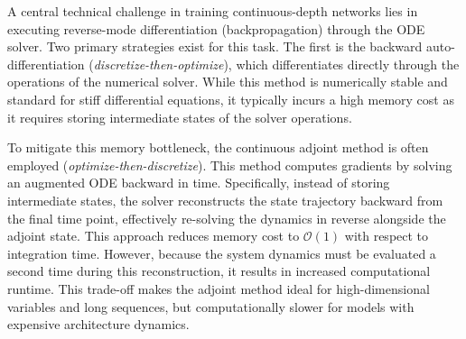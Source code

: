 A central technical challenge in training continuous-depth networks lies in executing reverse-mode differentiation (backpropagation) through the ODE solver. Two primary strategies exist for this task. The first is the backward auto-differentiation (\textit{discretize-then-optimize}), which differentiates directly through the operations of the numerical solver. While this method is numerically stable and standard for stiff differential equations, it typically incurs a high memory cost as it requires storing intermediate states of the solver operations.

To mitigate this memory bottleneck, the continuous adjoint method \citep{Bittner1963, adjoint1963, chen2019node} is often employed (\textit{optimize-then-discretize}). This method computes gradients by solving an augmented ODE backward in time. Specifically, instead of storing intermediate states, the solver reconstructs the state trajectory backward from the final time point, effectively re-solving the dynamics in reverse alongside the adjoint state. This approach reduces memory cost to $\mathcal{O}(1)$ with respect to integration time. However, because the system dynamics must be evaluated a second time during this reconstruction, it results in increased computational runtime. This trade-off makes the adjoint method ideal for high-dimensional variables and long sequences, but computationally slower for models with expensive architecture dynamics.

